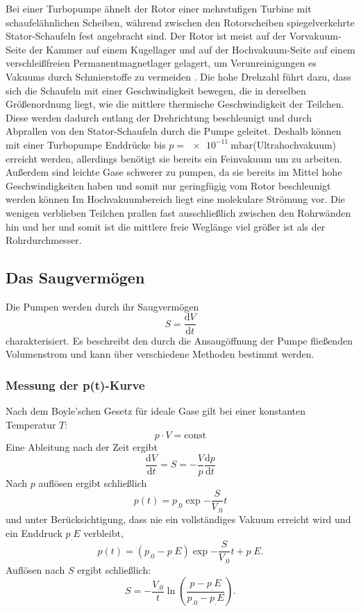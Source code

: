Bei einer Turbopumpe ähnelt der Rotor einer mehrstufigen Turbine mit schaufelähnlichen Scheiben, während zwischen den Rotorscheiben spiegelverkehrte Stator-Schaufeln fest angebracht sind.
Der Rotor ist meist auf der Vorvakuum-Seite der Kammer auf einem Kugellager und auf der Hochvakuum-Seite auf einem verschleißfreien Permanentmagnetlager gelagert, um Verunreinigungen es Vakuums durch Schmierstoffe zu vermeiden \cite{Pfeiffer}. Die hohe Drehzahl führt dazu, dass sich die Schaufeln mit einer Geschwindigkeit bewegen, die in derselben Größenordnung liegt, wie die mittlere thermische Geschwindigkeit der Teilchen. Diese werden dadurch entlang der Drehrichtung beschleunigt und durch Abprallen von den Stator-Schaufeln durch die Pumpe geleitet. Deshalb können mit einer Turbopumpe Enddrücke bis $p=\SI{e-11}{\milli\bar}$(Ultrahochvakuum) erreicht werden, allerdings benötigt sie bereits ein Feinvakuum um zu arbeiten. Außerdem sind leichte Gase schwerer zu pumpen, da sie bereits im Mittel hohe Geschwindigkeiten haben und somit nur geringfügig vom Rotor beschleunigt werden können Im Hochvakuumbereich liegt eine molekulare Strömung vor. Die wenigen verblieben Teilchen prallen fast ausschließlich zwischen den Rohrwänden hin und her und somit ist die mittlere freie Weglänge viel größer ist als der Rohrdurchmesser.


\subsection{Das Saugvermögen}
Die Pumpen werden durch ihr Saugvermögen 
\[
S=\frac{\mathrm{d}V}{\mathrm{d}t}
\]
charakterisiert.
Es beschreibt den durch die Ansaugöffnung der Pumpe fließenden Volumenstrom und kann über verschiedene Methoden bestimmt werden.

\subsubsection{Messung der p(t)-Kurve}

Nach dem Boyle'schen Gesetz für ideale Gase gilt bei einer konstanten Temperatur $T$:
\begin{equation}
p\cdot V =\text{const}\label{eq:Boyle}
\end{equation}
Eine Ableitung nach der Zeit ergibt
\[
\frac{\mathrm{d}V}{\mathrm{d}t} = S = - \frac{V}{p} \frac{\mathrm{d}p}{\mathrm{d}t}
\]
Nach $p$ auflösen ergibt schließlich
\begin{equation}
p(t)=p_.0\exp{-\frac{S}{V_.0}t}\label{eq:pt1}
\end{equation}
und unter  Berücksichtigung, dass nie ein vollständiges Vakuum erreicht wird und ein Enddruck $p_.E$ verbleibt,
\begin{equation}
p(t)=(p_.0-p_.E)\exp{-\frac{S}{V_.0}t}+p_.E\text{.}\label{eq:pt2}
\end{equation}
Auflösen nach $S$ ergibt schließlich:
\begin{equation}
S = -\frac{V_.0}{t}\ln\left(\frac{p-p_.E}{p_.0-p_.E}\right)\text{.}\label{eq:S2}
\end{equation}

